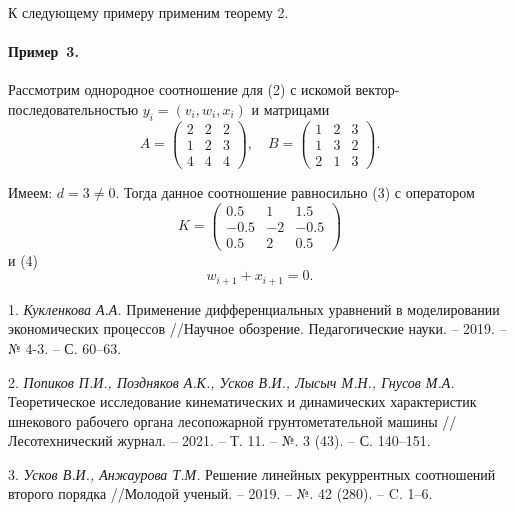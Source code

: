 \documentclass{vzmsthesis}
\begin{document}
К следующему примеру применим теорему 2.

\paragraph{Пример~3.}
Рассмотрим однородное соотношение для (2) с искомой вектор-последовательностью $y_i=(v_i, w_i, x_i)$ и матрицами
\[A=\begin{pmatrix}
2&2&2\\
1&2&3\\
4&4&4
\end{pmatrix}, \quad B= \begin{pmatrix}
1&2&3\\
1&3&2\\
2&1&3
\end{pmatrix}.\]

Имеем: $d=3\ne0$. Тогда данное соотношение равносильно (3) с оператором
\[K=\begin{pmatrix}
 0.5 &  1 &  1.5\\
-0.5 & -2 & -0.5\\
 0.5 &  2 &  0.5
\end{pmatrix}\]
и (4)
\[w_{i+1}+x_{i+1}=0.\]

\litlist

1. {\it Кукленкова А.А.} Применение дифференциальных уравнений в моделировании экономических процессов //Научное обозрение. Педагогические науки. – 2019. – № 4-3. – С. 60–63.

2. {\it Попиков П.И., Поздняков А.К., Усков В.И., Лысыч М.Н., Гнусов М.А.} Теоретическое исследование кинематических и динамических характеристик шнекового рабочего органа лесопожарной грунтометательной машины //Лесотехнический журнал. – 2021. – Т. 11. – №. 3 (43). – С. 140–151.

3. {\it Усков В.И., Анжаурова Т.М.} Решение линейных рекуррентных соотношений второго порядка //Молодой ученый. – 2019. – №. 42 (280). – C. 1–6.
\end{document}
